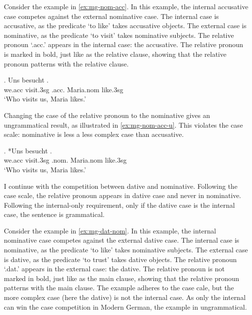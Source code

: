Consider the example in \ref{ex:mg-nom-acc}. In this example, the internal accusative case competes against the external nominative case.
The internal case is accusative, as the predicate  `to like' takes accusative objects.
The external case is nominative, as the predicate  `to visit' takes nominative subjects.
The relative pronoun  `.\ac{acc}.' appears in the internal case: the accusative. The relative pronoun is marked in bold, just like as the relative clause, showing that the relative pronoun patterns with the relative clause.

\exg. Uns besucht   .\\
 we.\ac{acc} visit.3\ac{sg}\scsub{[nom]} .\ac{acc}. Maria.\ac{nom} like.3\ac{sg}\scsub{[acc]}\\
 `Who visits us, Maria likes.' \label{ex:mg-nom-acc}

Changing the case of the relative pronoun to the nominative gives an ungrammatical result, as illustrated in \ref{ex:mg-nom-acc-u}. This violates the case scale: nominative is less a less complex case than accusative.

\exg. *Uns besucht   .\\
 we.\ac{acc} visit.3\ac{sg}\scsub{[nom]} .\ac{nom}. Maria.\ac{nom} like.3\ac{sg}\scsub{[acc]}\\
 `Who visits us, Maria likes.' \label{ex:mg-nom-acc-u}

I continue with the competition between dative and nominative. Following the case scale, the relative pronoun appears in dative case and never in nominative. Following the internal-only requirement, only if the dative case is the internal case, the sentence is grammatical.

Consider the example in \ref{ex:mg-dat-nom}. In this example, the internal nominative case competes against the external dative case.
The internal case is nominative, as the predicate  `to like' takes nominative subjects.
The external case is dative, as the predicate  `to trust' takes dative objects.
The relative pronoun  `.\ac{dat}.' appears in the external case: the dative. The relative pronoun is not marked in bold, just like as the main clause, showing that the relative pronoun patterns with the main clause.
The example adheres to the case cale, but the more complex case (here the dative) is not the internal case. As only the internal can win the case competition in Modern German, the example in ungrammatical.

